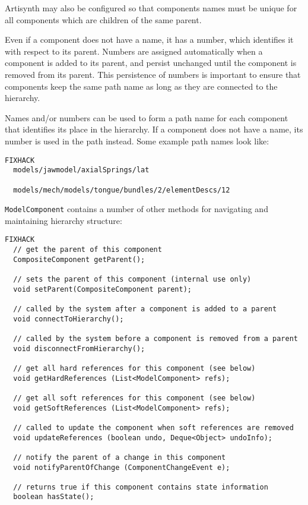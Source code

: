 \documentclass{article}
\begin{document}
Artisynth may also be configured so that components names must be
unique for all components which are children of the same parent.

Even if a component does not have a name, it has a number, which
identifies it with respect to its parent. Numbers are assigned
automatically when a component is added to its parent, and persist
unchanged until the component is removed from its parent.  This
persistence of numbers is important to ensure that components keep the
same path name as long as they are connected to the hierarchy.

Names and/or numbers can be used to form a path name for each
component that identifies its place in the hierarchy.  If a component
does not have a name, its number is used in the path instead. Some
example path names look like:

\begin{lstlisting}FIXHACK
  models/jawmodel/axialSprings/lat

  models/mech/models/tongue/bundles/2/elementDescs/12
\end{lstlisting}

{\tt ModelComponent} contains a number of other methods for navigating
and maintaining hierarchy structure:

\begin{lstlisting}FIXHACK
  // get the parent of this component
  CompositeComponent getParent();

  // sets the parent of this component (internal use only)
  void setParent(CompositeComponent parent);

  // called by the system after a component is added to a parent
  void connectToHierarchy();

  // called by the system before a component is removed from a parent
  void disconnectFromHierarchy();

  // get all hard references for this component (see below)
  void getHardReferences (List<ModelComponent> refs);

  // get all soft references for this component (see below)
  void getSoftReferences (List<ModelComponent> refs);

  // called to update the component when soft references are removed 
  void updateReferences (boolean undo, Deque<Object> undoInfo);

  // notify the parent of a change in this component
  void notifyParentOfChange (ComponentChangeEvent e);

  // returns true if this component contains state information
  boolean hasState();
\end{lstlisting}
\end{document}
